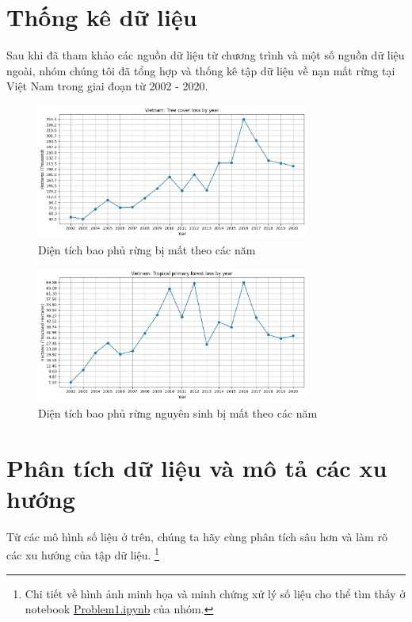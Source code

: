 \documentclass[a4paper,12pt]{report}
\begin{document}
\section{Thống kê dữ liệu} %
\label{sec:thống_kê_dữ_liệu}
\begin{flushleft}
	Sau khi đã tham khảo các nguồn dữ liệu từ chương trình và một số nguồn dữ liệu ngoài, nhóm chúng tôi đã tổng hợp và thống kê tập dữ liệu về nạn mất rừng tại Việt Nam trong giai đoạn từ 2002 - 2020.

	\begin{figure}[H]
		\centering
		\includegraphics[width = 0.8\textwidth]{images/tree_cover_loss_by_year.png}
		\caption{Diện tích bao phủ rừng bị mất theo các năm}
	\end{figure}

	\begin{figure}[H]
		\centering
		\includegraphics[width = 0.8\textwidth]{images/tropical_primary_forest_loss_by_year.png}
		\caption{Diện tích bao phủ rừng nguyên sinh bị mất theo các năm}
	\end{figure}
\end{flushleft}

\section{Phân tích dữ liệu và mô tả các xu hướng} %
\label{sec:phân_tích_dữ_liệu_và_mô_tả_các_xu_hướng}
\begin{flushleft}
	Từ các mô hình số liệu ở trên, chúng ta hãy cùng phân tích sâu hơn và làm rõ các xu hướng của tập dữ liệu. \footnote{Chi tiết về hình ảnh minh họa và minh chứng xử lý số liệu cho thể tìm thấy ở notebook \textcolor{blue}{\underline{\href{https://github.com/XuananLe/MathModelingContest/blob/main/APM_TMH_V2/Problem1.ipynb}{Problem1.ipynb}}} của nhóm.}
\end{flushleft}
\end{document}
